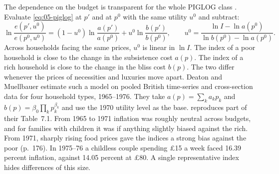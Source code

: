 The dependence on the budget is transparent for the whole PIGLOG class \citep[\S 7.1, eqs.~1.11--1.12,
pp.~175--176]{DeatonMuellbauer1980b}. Evaluate \eqref{eq:05-piglog} at $p'$ and at $p^0$ with the same
utility $u^0$ and subtract:
\begin{equation}\label{eq:05-piglog-col}
  \ln\frac{e(p',u^0)}{e(p^0,u^0)} = (1 - u^0)\ln\frac{a(p')}{a(p^0)} + u^0\ln\frac{b(p')}{b(p^0)},
  \qquad u^0 = \frac{\ln I - \ln a(p^0)}{\ln b(p^0) - \ln a(p^0)} .
\end{equation}
Across households facing the same prices, $u^0$ is linear in $\ln I$. The index of a poor household is
close to the change in the subsistence cost $a(p)$. The index of a rich household is close to the change
in the bliss cost $b(p)$. The two differ whenever the prices of necessities and luxuries move apart. Deaton and Muellbauer estimate such a model on pooled British time-series and cross-section data
for four household types, 1965--1976. They take $a(p) = \sum_k a_kp_k$ and $b(p) = \beta_0\prod_k
p_k^{\beta_k}$ and use the 1970 utility level as the base.  reproduces part of
their Table~7.1. From 1965 to 1971 inflation was roughly neutral across budgets, and for families with
children it was if anything slightly biased against the rich. From 1971, sharply rising food prices gave
the indices a strong bias against the poor (p.~176). In 1975--76 a childless couple spending \pounds 15 a
week faced 16.39 percent inflation, against 14.05 percent at \pounds 80.
A single representative index hides differences of this size.

